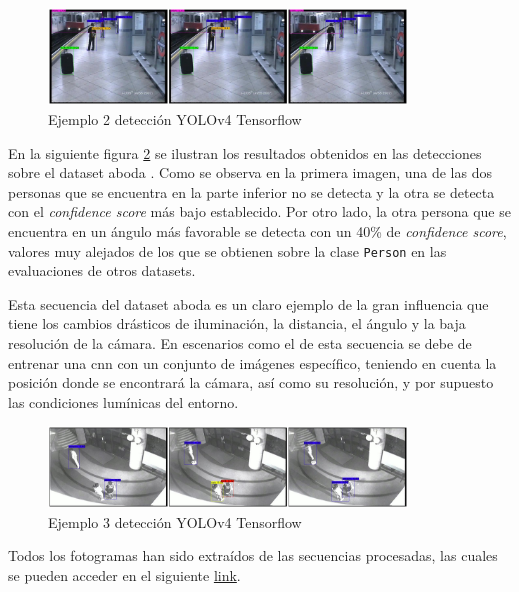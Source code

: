 \begin{figure}[ht]
\centering
\includegraphics[width=0.85\textwidth]{img/chapters/resultados/deteccion/avss-easy-detection-example.jpg}
\caption{\label{fig:avss-easy-detection-example}Ejemplo 2 detección YOLOv4 Tensorflow \cite{AVSSAB2007-dataset}}
\end{figure}

En la siguiente figura \ref{fig:aboda-video5-detection-example} se ilustran los resultados obtenidos en las detecciones sobre el dataset \gls{aboda} \cite{aboda-dataset}. Como se observa en la primera imagen, una de las dos personas que se encuentra en la parte inferior no se detecta y la otra se detecta con el \textit{confidence score} más bajo establecido. Por otro lado, la otra persona que se encuentra en un ángulo más favorable se detecta con un 40\% de \textit{confidence score}, valores muy alejados de los que se obtienen sobre la clase \texttt{Person} en las evaluaciones de otros datasets.

Esta secuencia del dataset \gls{aboda} es un claro ejemplo de la gran influencia que tiene los cambios drásticos de iluminación, la distancia, el ángulo y la baja resolución de la cámara. En escenarios como el de esta secuencia se debe de entrenar una \gls{cnn} con un conjunto de imágenes específico, teniendo en cuenta la posición donde se encontrará la cámara, así como su resolución, y por supuesto las condiciones lumínicas del entorno.

\begin{figure}[ht]
\centering
\includegraphics[width=0.85\textwidth]{img/chapters/resultados/deteccion/aboda-video5-detection-example.jpg}
\caption{\label{fig:aboda-video5-detection-example}Ejemplo 3 detección YOLOv4 Tensorflow \cite{aboda-dataset}}
\end{figure}

Todos los fotogramas han sido extraídos de las secuencias procesadas, las cuales se pueden acceder en el siguiente \href{https://drive.google.com/drive/folders/1hkUSC78H5moLyTqoNy0e0RhQTJSPt_um?usp=sharing}{link}.


